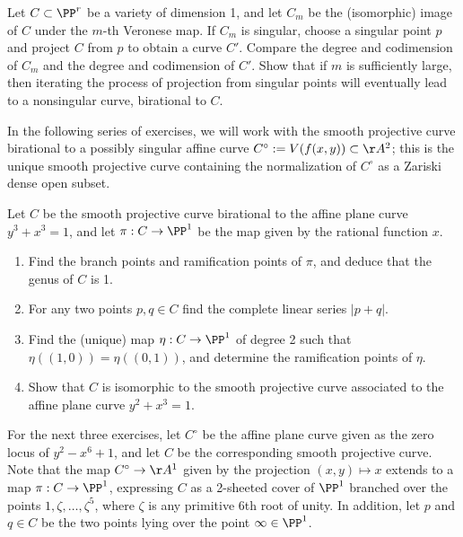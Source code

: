 \begin{exercise}\label{resolution by projection}
Let $C\subset \PP^r$ be a variety of dimension 1, and let $C_m$ be the (isomorphic) image of $C$ under the $m$-th Veronese map.
If $C_m$ is singular, choose a singular point $p$ and project $C$ from $p$ to obtain a curve $C'$. Compare the degree and codimension of $C_m$ and the degree and codimension of $C'$. Show that if $m$ is sufficiently large, then iterating the process
of projection from singular points will eventually lead to a nonsingular curve, birational to $C$.
\end{exercise}

In the following series of exercises, we will work with the smooth projective curve birational to a possibly singular affine curve $C^\circ := V(f(x,y)) \subset \AA^2$; this is the unique smooth projective curve containing the normalization of $C^\circ$ as a Zariski dense open subset.

\begin{exercise}
Let $C$ be the smooth projective curve birational to the affine plane curve $y^3 +x^3 = 1$, and let $\pi : C \to \PP^1$ be the map given by the rational function $x$.
\begin{enumerate}
\item Find the branch points and ramification points of $\pi$, and deduce that the genus of $C$ is 1.
\item For any two points $p, q \in C$ find the complete linear series $|p+q|$.
\item Find the (unique) map $\eta : C \to \PP^1$ of degree 2 such that $\eta((1,0)) = \eta((0,1))$, and determine the ramification points of $\eta$.
\item Show that $C$ is isomorphic to the smooth projective curve associated to the affine plane curve $y^2 +x^3 = 1$.
\end{enumerate}
\end{exercise}

For the next three exercises, let $C^\circ$ be the affine plane curve given as the zero locus of $y^2 - x^6 +1$, and let $C$ be the corresponding smooth projective curve. Note that the map $C^\circ \to \AA^1$ given by the projection $(x,y) \mapsto x$ extends to a map $\pi : C \to \PP^1$, expressing $C$ as a 2-sheeted cover of $\PP^1$ branched over the points $1, \zeta, \dots, \zeta^5$, where $\zeta$ is any primitive 6th root of unity. In addition, let $p$ and $q \in C$ be the two points lying over the point $\infty \in \PP^1$.

